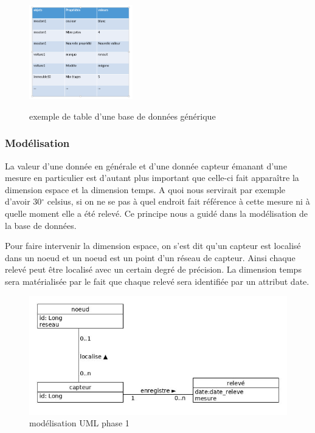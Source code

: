\begin{figure}[h!]
    \begin{center}
    \label{exemple de table d'une base de données générique}
         \includegraphics[width=0.4\textwidth]{images/bd_image2.png}
    \caption{exemple de table d'une base de données générique}
    \end{center}
\end{figure}


\subsubsection{Modélisation}
La valeur d'une donnée en générale et d'une donnée capteur émanant d'une mesure en particulier est d'autant plus important que celle-ci fait apparaître la dimension espace et la dimension temps.
A quoi nous servirait par exemple d'avoir 30$^\circ$ celsius, si on ne se pas à quel endroit fait référence à cette mesure ni à quelle moment elle a été relevé. Ce principe nous a guidé dans la modélisation de la base de données.

Pour faire intervenir la dimension espace, on s'est dit qu'un capteur est localisé dans un noeud et un noeud est un point d'un réseau de capteur. Ainsi chaque relevé peut être localisé avec un certain degré de précision.
La dimension temps sera matérialisée par le fait que chaque relevé sera identifiée par un attribut date. 
\begin{figure}[!h]
    \begin{center}
         \includegraphics[width=1\textwidth]{images/uml_image1.jpg}
    \caption{modélisation UML phase 1}
    \label{fig:modélisation UML phase 1}
    \end{center}
\end{figure}

